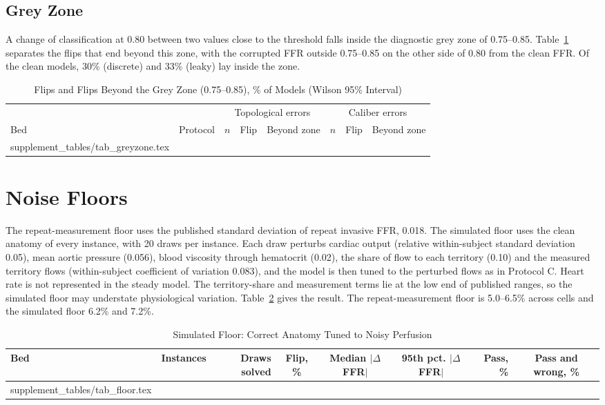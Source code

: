 \documentclass[journal,twoside,web,onecolumn]{ieeecolor}
\begin{document}
\subsection{Grey Zone}\label{sec:grey}
A change of classification at 0.80 between two values close to the threshold falls inside the diagnostic grey zone
of 0.75--0.85. Table~\ref{tab:grey} separates the flips that end beyond this zone, with the corrupted FFR outside
0.75--0.85 on the other side of 0.80 from the clean FFR. Of the clean models, 30\% (discrete) and 33\% (leaky) lay
inside the zone.
\begin{table}[!ht]
\caption{Flips and Flips Beyond the Grey Zone (0.75--0.85), \% of Models (Wilson 95\% Interval)}\label{tab:grey}
\centering\footnotesize
\begin{tabular}{@{}llrccrcc@{}}
\toprule
 & & \multicolumn{3}{c}{Topological errors} & \multicolumn{3}{c}{Caliber errors}\\
\cmidrule(lr){3-5}\cmidrule(l){6-8}
Bed & Protocol & $n$ & Flip & Beyond zone & $n$ & Flip & Beyond zone\\
\midrule
{} supplement_tables/tab_greyzone.tex 
\bottomrule
\end{tabular}
\end{table}

\FloatBarrier
\section{Noise Floors}\label{sec:floor}
The repeat-measurement floor uses the published standard deviation of repeat invasive FFR, 0.018. The simulated floor
uses the clean anatomy of every instance, with 20 draws per instance. Each draw perturbs cardiac output (relative
within-subject standard deviation 0.05), mean aortic pressure (0.056), blood viscosity through hematocrit (0.02), the
share of flow to each territory (0.10) and the measured territory flows (within-subject coefficient of variation
0.083), and the model is then tuned to the perturbed flows as in Protocol C. Heart rate is not represented in the
steady model. The territory-share and measurement terms lie at the low end of published ranges, so the simulated floor
may understate physiological variation. Table~\ref{tab:floor} gives the result. The repeat-measurement floor is
5.0--6.5\% across cells and the simulated floor 6.2\% and 7.2\%.
\begin{table}[!ht]
\caption{Simulated Floor: Correct Anatomy Tuned to Noisy Perfusion}\label{tab:floor}
\centering\small
\begin{tabular}{@{}lrrcccrc@{}}
\toprule
Bed & Instances & Draws solved & Flip, \% & Median $|\Delta$FFR$|$ & 95th pct. $|\Delta$FFR$|$ & Pass, \% &
Pass and wrong, \%\\
\midrule
{} supplement_tables/tab_floor.tex 
\bottomrule
\end{tabular}
\end{table}
\end{document}

